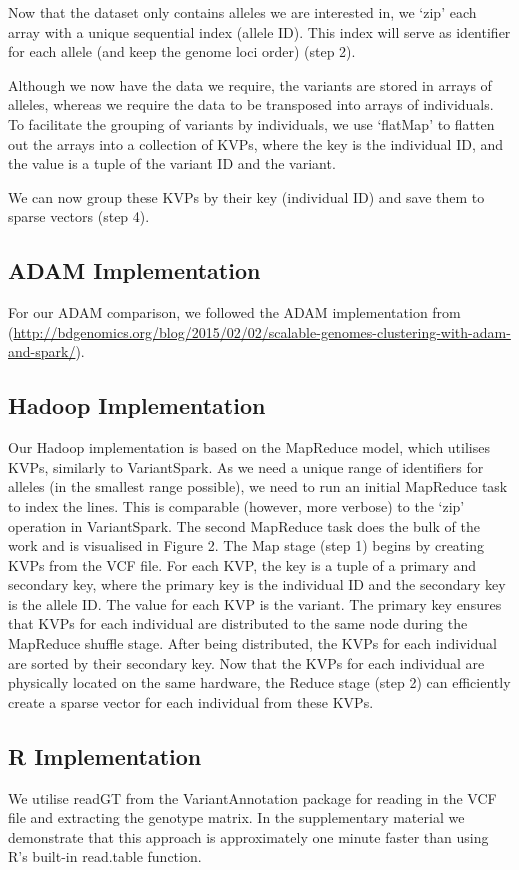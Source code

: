 \documentclass{bmcart}
\newcommand{\variantSpark}{{\sc VariantSpark}}
\begin{document}
Now that the dataset only contains alleles we are interested in, we `zip' each array with a unique sequential index (allele ID). This index will serve
as identifier for each allele (and keep the genome loci order) (step 2).

Although we now have the data we require, the variants are stored in arrays of alleles, whereas we require the data to be transposed into arrays of individuals.
To facilitate the grouping of variants by individuals, we use `flatMap' to flatten out the arrays into a collection of KVPs, where the key is the individual ID, and the
value is a tuple of the variant ID and the variant.

We can now group these KVPs by their key (individual ID) and save them to sparse vectors (step 4).


\subsection*{{\sc ADAM} Implementation}
For our {\sc ADAM} comparison, we followed the {\sc ADAM} implementation from (\url{http://bdgenomics.org/blog/2015/02/02/scalable-genomes-clustering-with-adam-and-spark/}).

\subsection*{Hadoop Implementation}
Our Hadoop implementation is based on the MapReduce model, which utilises KVPs, similarly to \variantSpark{}.
As we need a unique range of identifiers for alleles (in the smallest range possible), we need to run an initial MapReduce task to index the lines. This is comparable (however, more verbose) to the `zip' operation in \variantSpark{}.
The second MapReduce task does the bulk of the work and is visualised in Figure 2. The Map stage (step 1) begins by creating KVPs from the VCF file. For each KVP, the key is a tuple of a primary and secondary key, where the primary key is the individual ID and the secondary key is the allele ID. The value for each KVP is the variant.
The primary key ensures that KVPs for each individual are distributed to the same node during the MapReduce shuffle stage. After being distributed, the KVPs for each individual are sorted by their secondary key.
Now that the KVPs for each individual are physically located on the same hardware, the Reduce stage (step 2) can efficiently create a sparse vector for each individual from these KVPs. 

\subsection*{R Implementation}
We utilise {\sc readGT} from the {\sc VariantAnnotation} package for reading in the VCF file and extracting the genotype matrix.  
In the supplementary material we demonstrate that this approach is approximately one minute faster than using R's built-in {\sc read.table} function.
\end{document}

